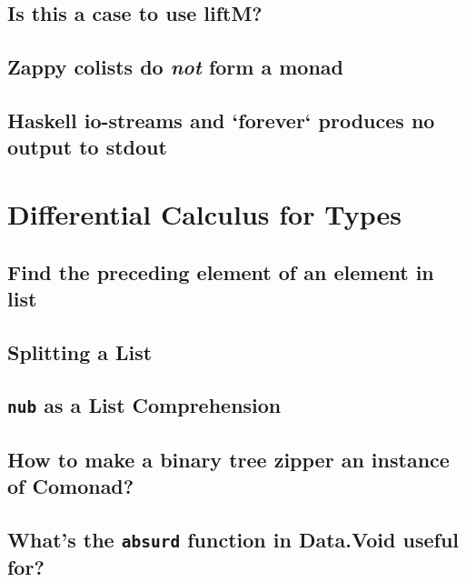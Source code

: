 \documentclass{book}%
\begin{document}
\section{Is this a case to use liftM?}


\section{Zappy colists do \emph{not} form a monad}


\section{Haskell io-streams and `forever` produces no output to stdout}



\chapter{Differential Calculus for Types}

\section{Find the preceding element of an element in list}


\section{Splitting a List}


\section{{\texttt{nub}} as a List Comprehension}


\section{How to make a binary tree zipper an instance of Comonad?}


\section{What's the {\texttt{absurd}} function in Data.Void useful for?}

\end{document}
